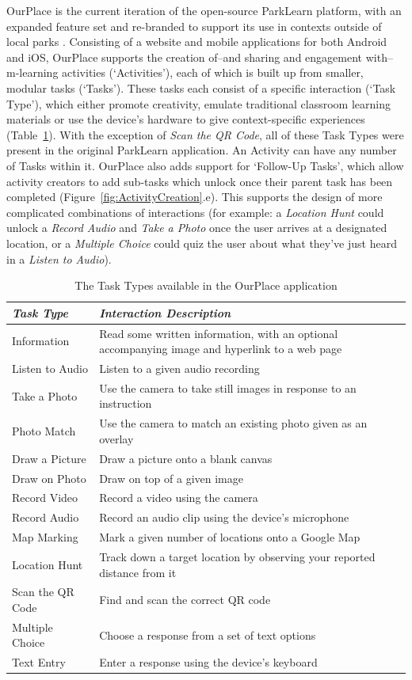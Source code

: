\documentclass[,hyphens]{sigchi}
\begin{document}
OurPlace is the current iteration of the open-source ParkLearn platform, with an expanded feature set and re-branded to support its use in contexts outside of local parks \cite{Richardson2018a}. Consisting of a website and mobile applications for both Android and iOS, OurPlace supports the creation of--and sharing and engagement with--m-learning activities (`Activities'), each of which is built up from smaller, modular tasks (`Tasks'). These tasks each consist of a specific interaction (`Task Type'), which either promote creativity, emulate traditional classroom learning materials or use the device's hardware to give context-specific experiences (Table~\ref{tab:TaskTypes}). With the exception of \textit{Scan the QR Code}, all of these Task Types were present in the original ParkLearn application. An Activity can have any number of Tasks within it. OurPlace also adds support for `Follow-Up Tasks', which allow activity creators to add sub-tasks which unlock once their parent task has been completed (Figure~\ref{fig:ActivityCreation}.e). This supports the design of more complicated combinations of interactions (for example: a \textit{Location Hunt} could unlock a \textit{Record Audio} and \textit{Take a Photo} once the user arrives at a designated location, or a \textit{Multiple Choice} could quiz the user about what they've just heard in a \textit{Listen to Audio}).

\begin{table}
  \centering
  \begin{tabular}{l|p{50mm}}
    {\small\textit{Task Type}}
    & {\small \textit{Interaction Description}} \\
    \midrule
    Information & Read some written information, with an optional accompanying image and hyperlink to a web page \\
    Listen to Audio & Listen to a given audio recording \\
    Take a Photo & Use the camera to take still images in response to an instruction \\
    Photo Match & Use the camera to match an existing photo given as an overlay \\
    Draw a Picture & Draw a picture onto a blank canvas \\
    Draw on Photo & Draw on top of a given image \\
    Record Video & Record a video using the camera \\
    Record Audio & Record an audio clip using the device's microphone \\
    Map Marking & Mark a given number of locations onto a Google Map \\
    Location Hunt & Track down a target location by observing your reported distance from it \\
    Scan the QR Code & Find and scan the correct QR code \\
    Multiple Choice & Choose a response from a set of text options \\
    Text Entry & Enter a response using the device's keyboard
  \end{tabular}
  \caption{The Task Types available in the OurPlace application}~\label{tab:TaskTypes}
\end{table}
\end{document}
